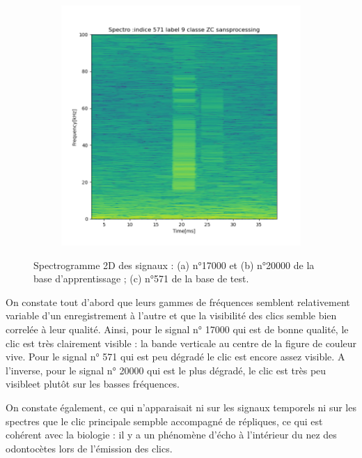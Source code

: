 \begin{figure}[!h]
\begin{subfigure}[b]{0.3\textwidth}
    \caption{}
  \end{subfigure}
  \begin{subfigure}[b]{0.3\textwidth}
    \includegraphics[width=\textwidth]{./images/indice571Spectro2Dlabel9classeZCsansprocessingsanszoom.png}
    \caption{}
  \end{subfigure}
  \caption{Spectrogramme 2D des signaux : (a) n°17000 et (b) n°20000 de la base d'apprentissage ; (c) n°571 de la base de test.%
  \label{fig:spectros2D}}
\end{figure}

On constate tout d'abord  que leurs gammes de fréquences semblent relativement variable d'un enregistrement à l'autre et que la visibilité des clics semble bien correlée à leur qualité.
Ainsi, pour le signal n° 17000 qui est de bonne qualité, le clic est très clairement visible : la bande verticale au centre de la figure de couleur vive.
Pour le signal n° 571 qui est peu dégradé le clic est encore assez visible.  
A l'inverse, pour le signal n° 20000 qui est le plus dégradé, le clic est très peu visibleet plutôt sur les basses fréquences.

On constate également, ce qui n'apparaisait ni sur les signaux temporels ni sur les spectres que le clic principale sempble accompagné de répliques, ce qui est cohérent avec la biologie : il y a un phénomène d'écho à l'intérieur du nez des odontocètes lors de l'émission des clics.

